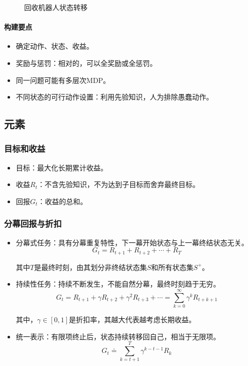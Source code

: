 \documentclass[
12pt, %
a4paper, 
oneside, %
headinclude,footinclude, %
]{scrartcl}
\begin{document}
\begin{figure}[H]
\centering
{} \quad
{}
\caption[回收机器人状态转移]{回收机器人状态转移}
\end{figure}
\paragraph{构建要点}
\begin{itemize}
\item 确定动作、状态、收益。
\item 奖励与惩罚：相对的，可以全奖励或全惩罚。
\item 同一问题可能有多层次MDP。
\item 不同状态的可行动作设置：利用先验知识，人为排除愚蠢动作。
\end{itemize}
\subsection{元素}
\subsubsection{目标和收益}
\begin{itemize}
\item 目标：最大化长期累计收益。
\item 收益$ R_t $：不含先验知识，不为达到子目标而舍弃最终目标。
\item 回报$ G_t $：收益的总和。
\end{itemize}
\subsubsection{分幕回报与折扣}
\begin{itemize}
\item 分幕式任务：具有分幕重复特性，下一幕开始状态与上一幕终结状态无关。
$$ G_t = R_{t + 1} + R_{t + 2} + \cdots + R_T $$

其中$ T $是最终时刻，由其划分非终结状态集$ S $和所有状态集$ S^+ $。
\item 持续性任务：持续不断发生，不能自然分幕，最终时刻趋于无穷。
$$ G_t = R_{t + 1} + \gamma R_{t + 2} + \gamma^2 R_{t + 3} + \cdots = \sum_{k = 0}^{\infty} \gamma^k R_{t + k + 1} $$

其中，$ \gamma \in [0, 1] $是折扣率，其越大代表越考虑长期收益。
\item 统一表示：有限项终止后，状态持续转移回自己，相当于无限项。
$$ G_t \doteq \sum_{k = t + 1}^{T} \gamma^{k - t - 1} R_k $$
\end{itemize}
\end{document}
